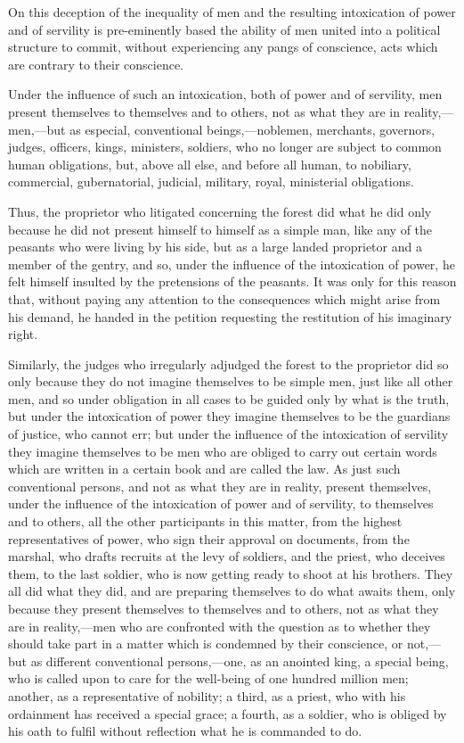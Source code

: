 \documentclass{book}
\begin{document}
On this deception of the inequality of men and the resulting intoxication of power and of servility is pre-eminently based the ability of men united into a political structure to commit, without experiencing any pangs of conscience, acts which are contrary to their conscience.

Under the influence of such an intoxication, both of power and of servility, men present themselves to themselves and to others, not as what they are in reality,—men,—but as especial, conventional beings,—noblemen, merchants, governors, judges, officers, kings, ministers, soldiers, who no longer are subject to common human obligations, but, above all else, and before all human, to nobiliary, commercial, gubernatorial, judicial, military, royal, ministerial obligations.

Thus, the proprietor who litigated concerning the forest did what he did only because he did not present himself to himself as a simple man, like any of the peasants who were living by his side, but as a large landed proprietor and a member of the gentry, and so, under the influence of the intoxication of power, he felt himself insulted by the pretensions of the peasants. It was only for this reason that, without paying any attention to the consequences which might arise from his demand, he handed in the petition requesting the restitution of his imaginary right.

Similarly, the judges who irregularly adjudged the forest to the proprietor did so only because they do not imagine themselves to be simple men, just like all other men, and so under obligation in all cases to be guided only by what is the truth, but under the intoxication of power they imagine themselves to be the guardians of justice, who cannot err; but under the influence of the intoxication of servility they imagine themselves to be men who are obliged to carry out certain words which are written in a certain book and are called the law. As just such conventional persons, and not as what they are in reality, present themselves, under the influence of the intoxication of power and of servility, to themselves and to others, all the other participants in this matter, from the highest representatives of power, who sign their approval on documents, from the marshal, who drafts recruits at the levy of soldiers, and the priest, who deceives them, to the last soldier, who is now getting ready to shoot at his brothers. They all did what they did, and are preparing themselves to do what awaits them, only because they present themselves to themselves and to others, not as what they are in reality,—men who are confronted with the question as to whether they should take part in a matter which is condemned by their conscience, or not,—but as different conventional persons,—one, as an anointed king, a special being, who is called upon to care for the well-being of one hundred million men; another, as a representative of nobility; a third, as a priest, who with his ordainment has received a special grace; a fourth, as a soldier, who is obliged by his oath to fulfil without reflection what he is commanded to do.
\end{document}
